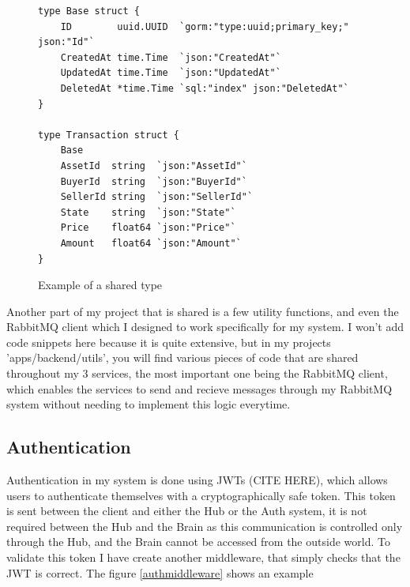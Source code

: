 \documentclass[titlepage]{article}
\begin{document}
\begin{figure}
  \caption{Example of a shared type}
  \label{sharedtype}
  \begin{verbatim}
type Base struct {
	ID        uuid.UUID  `gorm:"type:uuid;primary_key;" json:"Id"`
	CreatedAt time.Time  `json:"CreatedAt"`
	UpdatedAt time.Time  `json:"UpdatedAt"`
	DeletedAt *time.Time `sql:"index" json:"DeletedAt"`
}

type Transaction struct {
	Base
	AssetId  string  `json:"AssetId"`
	BuyerId  string  `json:"BuyerId"`
	SellerId string  `json:"SellerId"`
	State    string  `json:"State"`
	Price    float64 `json:"Price"`
	Amount   float64 `json:"Amount"`
}
  \end{verbatim}
\end{figure}

Another part of my project that is shared is a few utility functions, and even the RabbitMQ client which I designed to work specifically for my system. I won't add code snippets here because it is quite extensive, but in my projects 'apps/backend/utils', you will find various pieces of code that are shared throughout my 3 services, the most important one being the RabbitMQ client, which enables the services to send and recieve messages through my RabbitMQ system without needing to implement this logic everytime.

\pagebreak

\subsection{Authentication}
Authentication in my system is done using JWTs (CITE HERE), which allows users to authenticate themselves with a cryptographically safe token. This token is sent between the client and either the Hub or the Auth system, it is not required between the Hub and the Brain as this communication is controlled only through the Hub, and the Brain cannot be accessed from the outside world. To validate this token I have create another middleware, that simply checks that the JWT is correct. The figure \ref{authmiddleware} shows an example
\end{document}
